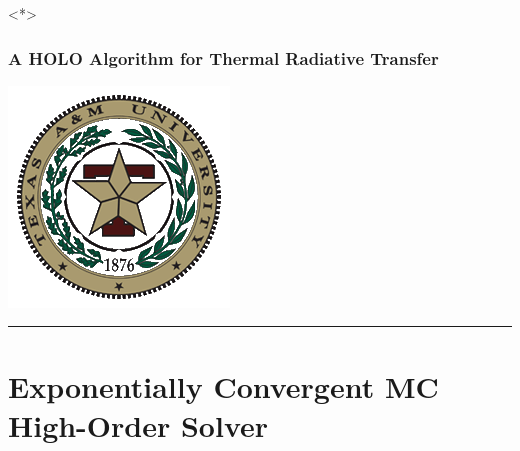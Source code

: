 \documentclass[xcolor=dvipsnames,hyperref={pdfpagelabels=false},unknownkeysallowed]{beamer}
\newcommand{\shorttitle}{\color{black} A HOLO Algorithm for Thermal Radiative Transfer
    \makebox[\linewidth]{\rule{\textwidth}{5pt}}
}
\begin{document}
\begin{frame}<*>
    \frametitle{\shorttitle}
        \vspace{0pt}
        \begin{minipage}[c][0.6\textheight]{0.2\textwidth}
            \hspace{-2em}\includegraphics[width=\textwidth]{tamu_seal.png}\hspace{1em}
            \rule[-0.3\textheight]{1pt}{0.8\textheight}
        \end{minipage}
    \vspace{0pt}
        \begin{minipage}[c][0.6\textheight]{0.74\textwidth}
\tableofcontents[
hideothersubsections,
sectionstyle=show,
subsectionstyle=hide
]
         \end{minipage}
\end{frame}


\section{Exponentially Convergent MC High-Order Solver}
\subsection{}
\end{document}
